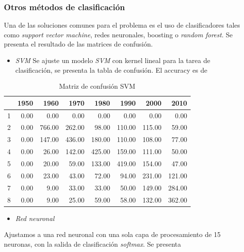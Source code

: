 \documentclass[conference,final,]{IEEEtran}
\providecommand{\tightlist}{%
  \setlength{\itemsep}{0pt}\setlength{\parskip}{0pt}}
\begin{document}
\hypertarget{otros-metodos-de-clasificacion}{%
\subsubsection{Otros métodos de
clasificación}\label{otros-metodos-de-clasificacion}}

Una de las soluciones comunes para el problema es el uso de
clasificadores tales como \emph{support vector machine}, redes
neuronales, boosting o \emph{random forest}. Se presenta el resultado de
las matrices de confusión.

\begin{itemize}
\tightlist
\item
  \emph{SVM} Se ajuste un modelo \emph{SVM} con kernel lineal para la
  tarea de clasificación, se presenta la tabla de confusión. El accuracy
  es de
\end{itemize}

\begin{table}[!t]
\centering
\caption{Matriz de confusión SVM} 
\begin{tabular}{r|rrrrrrr}
  \hline
 & 1950 & 1960 & 1970 & 1980 & 1990 & 2000 & 2010 \\ 
  \hline
1 & 0.00 & 0.00 & 0.00 & 0.00 & 0.00 & 0.00 & 0.00 \\ 
  2 & 0.00 & 766.00 & 262.00 & 98.00 & 110.00 & 115.00 & 59.00 \\ 
  3 & 0.00 & 147.00 & 436.00 & 180.00 & 110.00 & 108.00 & 77.00 \\ 
  4 & 0.00 & 26.00 & 142.00 & 425.00 & 159.00 & 111.00 & 50.00 \\ 
  5 & 0.00 & 20.00 & 59.00 & 133.00 & 419.00 & 154.00 & 47.00 \\ 
  6 & 0.00 & 23.00 & 43.00 & 72.00 & 94.00 & 231.00 & 121.00 \\ 
  7 & 0.00 & 9.00 & 33.00 & 33.00 & 50.00 & 149.00 & 284.00 \\ 
  8 & 0.00 & 9.00 & 25.00 & 59.00 & 58.00 & 132.00 & 362.00 \\ 
   \hline
\end{tabular}
\end{table}

\begin{itemize}
\tightlist
\item
  \emph{Red neuronal}
\end{itemize}

Ajustamos a una red neuronal con una sola capa de procesamiento de 15
neuronas, con la salida de clasificación \emph{softmax}. Se presenta
\end{document}

